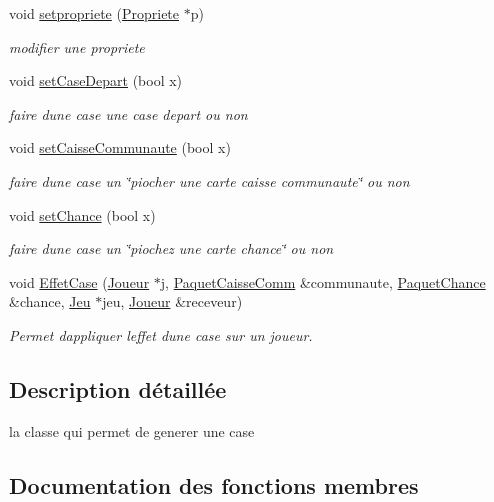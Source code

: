 \begin{DoxyCompactItemize}
void \hyperlink{classCase_acc784453c20a6f7816da47e7b3d2441c}{setpropriete} (\hyperlink{classPropriete}{Propriete} $\ast$p)
\begin{DoxyCompactList}\small\item\em modifier une propriete \end{DoxyCompactList}\item 
void \hyperlink{classCase_a524646e72a6eecbf98a26cc7c34bc644}{set\+Case\+Depart} (bool x)
\begin{DoxyCompactList}\small\item\em faire d\textquotesingle{}une case une case depart ou non \end{DoxyCompactList}\item 
void \hyperlink{classCase_a52c2c78379efcd1d9b33b05c1b34a186}{set\+Caisse\+Communaute} (bool x)
\begin{DoxyCompactList}\small\item\em faire d\textquotesingle{}une case un \char`\"{}piocher une carte caisse communaute\char`\"{} ou non \end{DoxyCompactList}\item 
void \hyperlink{classCase_a24250d3057e9e7405de58ef4851cd030}{set\+Chance} (bool x)
\begin{DoxyCompactList}\small\item\em faire d\textquotesingle{}une case un \char`\"{}piochez une carte chance\char`\"{} ou non \end{DoxyCompactList}\item 
void \hyperlink{classCase_a06c30f3212045e598dcdf9abc3c87f3d}{Effet\+Case} (\hyperlink{classJoueur}{Joueur} $\ast$j, \hyperlink{classPaquetCaisseComm}{Paquet\+Caisse\+Comm} \&communaute, \hyperlink{classPaquetChance}{Paquet\+Chance} \&chance, \hyperlink{classJeu}{Jeu} $\ast$jeu, \hyperlink{classJoueur}{Joueur} \&receveur)
\begin{DoxyCompactList}\small\item\em Permet d\textquotesingle{}appliquer l\textquotesingle{}effet d\textquotesingle{}une case sur un joueur. \end{DoxyCompactList}\end{DoxyCompactItemize}


\subsection{Description détaillée}
la classe qui permet de generer une case 

\subsection{Documentation des fonctions membres}
